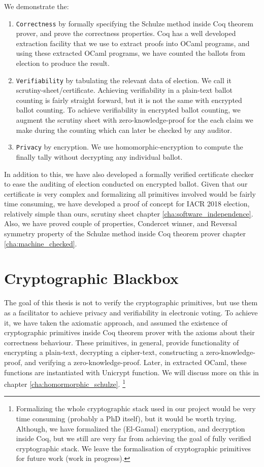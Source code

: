 We demonstrate the:
\begin{enumerate}
 \item \texttt{Correctness} by formally specifying the Schulze method  inside 
 Coq theorem prover, and prove the correctness properties. 
 Coq has a well developed extraction facility that 
 we use to extract proofs into OCaml programs, and using these extracted OCaml programs, we 
 have counted the ballots from election to produce the result. 
 \item \texttt{Verifiability} by tabulating the relevant data of election. We call it scrutiny-sheet/certificate. 
   Achieving verifiability in a plain-text ballot counting is fairly straight forward, but it is not 
   the same with encrypted ballot counting.  To achieve verifiability in encrypted ballot counting, 
   we augment the scrutiny sheet with zero-knowledge-proof for the each claim we make during the 
   counting which can  later be checked by any auditor.  
 \item \texttt{Privacy} by encryption. We use homomorphic-encryption to compute the 
  finally tally without decrypting any individual ballot. 
\end{enumerate}


In addition to this, we have also developed a formally verified certificate checker to ease the 
auditing of election conducted on encrypted ballot.  Given that our certificate is very complex 
and formalizing all primitives involved would be fairly time consuming, we have developed a 
proof of concept for IACR 2018 election, relatively simple than ours, scrutiny sheet
chapter \ref{cha:software_independence}. 
Also, we have proved couple of properties, Condercet winner, and Reversal symmetry property 
of the Schulze method inside Coq theorem prover chapter \ref{cha:machine_checked}. 

\section{Cryptographic Blackbox}
The goal of this thesis is not to verify the cryptographic primitives, but use them as a 
facilitator to achieve privacy and verifiability in electronic voting. To achieve it, we have 
taken the axiomatic approach, and assumed the existence of cryptographic primitives 
inside Coq theorem prover with the 
axioms about their correctness behaviour. These primitives, in general, provide functionality 
of encrypting a plain-text, decrypting a cipher-text, constructing a zero-knowledge-proof, 
and verifying a zero-knowledge-proof. Later, in extracted OCaml, these functions are instantiated 
with Unicrypt\citep{LocherH14} function.  We will discuss more on this in chapter
\ref{cha:homormorphic_schulze}.
\footnote{Formalizing the whole cryptographic stack used in our 
project would be very time consuming (probably a PhD itself), but it would be worth trying. 
Although, we have formalized the (El-Gamal) encryption, and decryption inside Coq, but we still 
are very far from achieving the goal of fully verified cryptographic stack.  We leave the formalisation 
of cryptographic primitives for future work (work in progress).}



